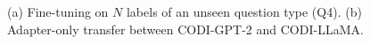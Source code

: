 \begin{figure}[t]
\centering
{}
\caption{(a) Fine-tuning on $N$ labels of an unseen question type (Q4). (b) Adapter-only transfer between CODI-GPT-2 and CODI-LLaMA.}
\label{fig:transfer}
\end{figure}
